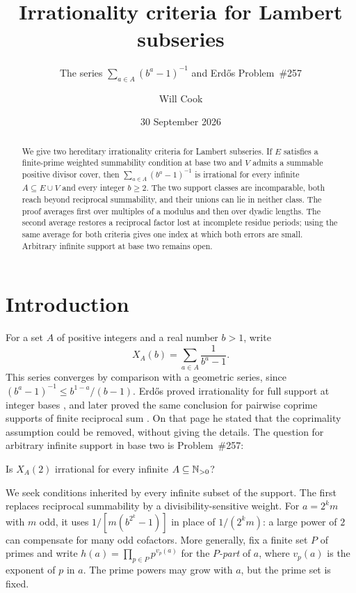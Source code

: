 \documentclass[11pt]{article}
\title{Irrationality criteria for Lambert subseries}
\subtitle{The series $\sum_{a\in A}(b^a-1)^{-1}$ and Erd\H{o}s Problem~\#257}
\author{Will Cook}
\date{30 September 2026}
\begin{document}
\maketitle
\noteprovenance
\begin{abstract}
We give two hereditary irrationality criteria for Lambert subseries.
If $E$ satisfies a finite-prime weighted summability condition at base two
and $V$ admits a summable positive divisor cover, then
$\sum_{a\in A}(b^a-1)^{-1}$ is irrational for every infinite
$A\subseteq E\cup V$ and every integer $b\ge2$. The two support
classes are incomparable, both reach beyond reciprocal summability,
and their unions can lie in neither class. The proof averages first
over multiples of a modulus and then over dyadic lengths. The second
average restores a reciprocal factor lost at incomplete residue periods;
using the same average for both criteria gives one index at which both
errors are small. Arbitrary infinite support at base two remains open.
\end{abstract}

\section{Introduction}\label{sec:problem}
For a set $A$ of positive integers and a real number $b>1$, write
\[
 X_A(b)=\sum_{a\in A}\frac1{b^a-1}.
\]
This series converges by comparison with a geometric series, since
$(b^a-1)^{-1}\le b^{1-a}/(b-1)$. Erd\H{o}s proved irrationality
for full support at integer bases
\cite{erdos1948}, and later proved the same conclusion for pairwise
coprime supports of finite reciprocal sum \cite[p.~222]{erdos1968}.
On that page he stated that the coprimality assumption could be removed,
without giving the details. The question for arbitrary infinite support
in base two is Problem~\#257:

\begin{problem}[Erd\H{o}s \#257]\label{res:problem}
Is $X_A(2)$ irrational for every infinite $A\subseteq\mathbb{N}_{>0}$?
\end{problem}

We seek conditions inherited by every infinite subset of the support.
The first replaces reciprocal summability by a divisibility-sensitive
weight. For $a=2^km$ with $m$ odd, it uses
$1/[m(b^{2^k}-1)]$ in place of $1/(2^km)$: a large power of $2$ can
compensate for many odd cofactors. More generally, fix a finite set $P$
of primes and write $h(a)=\prod_{p\in P}p^{v_p(a)}$ for the
\emph{$P$-part} of $a$, where $v_p(a)$ is the exponent of $p$ in $a$.
The prime powers may grow with $a$, but the prime set is fixed.
\end{document}
